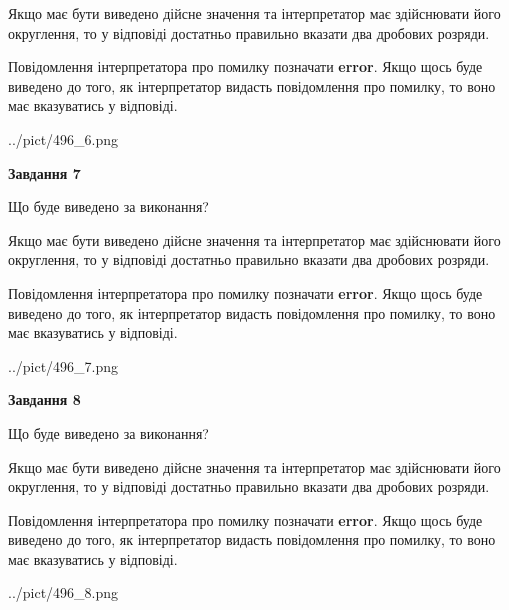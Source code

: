\documentclass[12pt, ukrainian]{article}
\begin{document}
{\begin {Large}
Якщо має бути виведено дійсне значення та інтерпретатор має здійснювати його округлення, 
то у відповіді достатньо правильно вказати два дробових розряди.

Повідомлення інтерпретатора про помилку позначати \textbf{error}.
Якщо щось буде виведено до того, як інтерпретатор видасть повідомлення про помилку, 
то воно має вказуватись у відповіді. \par

\begin{center}
	{../pict/496_6.png}
\end{center}
\newpage

{\begin {center}\textbf{Завдання 7}\end {center}}\par
Що буде виведено за виконання? \par

Якщо має бути виведено дійсне значення та інтерпретатор має здійснювати його округлення, 
то у відповіді достатньо правильно вказати два дробових розряди.

Повідомлення інтерпретатора про помилку позначати \textbf{error}.
Якщо щось буде виведено до того, як інтерпретатор видасть повідомлення про помилку, 
то воно має вказуватись у відповіді. \par

\begin{center}
	{../pict/496_7.png}
\end{center}
\newpage

{\begin {center}\textbf{Завдання 8}\end {center}}\par
Що буде виведено за виконання? \par

Якщо має бути виведено дійсне значення та інтерпретатор має здійснювати його округлення, 
то у відповіді достатньо правильно вказати два дробових розряди.

Повідомлення інтерпретатора про помилку позначати \textbf{error}.
Якщо щось буде виведено до того, як інтерпретатор видасть повідомлення про помилку, 
то воно має вказуватись у відповіді. \par

\begin{center}
	{../pict/496_8.png}
\end{center}
\newpage


\end{Large}}
\end{document}
